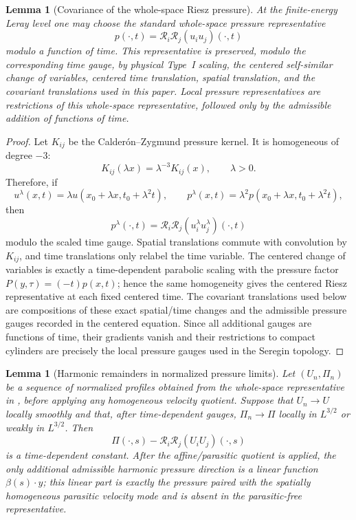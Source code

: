 \documentclass[11pt]{amsart}
\numberwithin{equation}{section}
\theoremstyle{plain}
\newtheorem{lemma}[theorem]{Lemma}
\theoremstyle{definition}
\theoremstyle{remark}
\begin{document}
\begin{lemma}[Covariance of the whole-space Riesz pressure]
\label{lem:whole-space-riesz-pressure-covariance}
At the finite-energy Leray level one may choose the standard whole-space
pressure representative
\[
   p(\cdot,t)=\mathcal R_i\mathcal R_j(u_i u_j)(\cdot,t)
\]
modulo a function of time.  This representative is preserved, modulo the
corresponding time gauge, by physical Type~I scaling, the centered
self-similar change of variables, centered time translation, spatial
translation, and the covariant translations used in this paper.  Local pressure
representatives are restrictions of this whole-space representative, followed
only by the admissible addition of functions of time.
\end{lemma}

\begin{proof}
Let \(K_{ij}\) be the Calder\'on--Zygmund pressure kernel.  It is homogeneous of
degree \(-3\):
\[
   K_{ij}(\lambda x)=\lambda^{-3}K_{ij}(x),\qquad \lambda>0 .
\]
Therefore, if
\[
   u^\lambda(x,t)=\lambda u(x_0+\lambda x,t_0+\lambda^2t),
   \qquad
   p^\lambda(x,t)=\lambda^2p(x_0+\lambda x,t_0+\lambda^2t),
\]
then
\[
   p^\lambda(\cdot,t)
   =
   \mathcal R_i\mathcal R_j
   (u^\lambda_i u^\lambda_j)(\cdot,t)
\]
modulo the scaled time gauge.  Spatial translations commute with convolution by
\(K_{ij}\), and time translations only relabel the time variable.  The centered
change of variables is exactly a time-dependent parabolic scaling with the
pressure factor \(P(y,\tau)=(-t)p(x,t)\); hence the same homogeneity gives the
centered Riesz representative at each fixed centered time.  The covariant
translations used below are compositions of these exact spatial/time changes
and the admissible pressure gauges recorded in the centered equation.  Since
all additional gauges are functions of time, their gradients vanish and their
restrictions to compact cylinders are precisely the local pressure gauges used
in the Seregin topology.
\end{proof}

\begin{lemma}[Harmonic remainders in normalized pressure limits]
\label{lem:local-harmonic-remainders-affine}
Let \((U_n,\Pi_n)\) be a sequence of normalized profiles obtained from the
whole-space representative in
, before applying any
homogeneous velocity quotient.  Suppose that \(U_n\to U\) locally smoothly and
that, after time-dependent gauges, \(\Pi_n\to\Pi\) locally in
\(L^{3/2}\) or weakly in \(L^{3/2}\).  Then
\[
   \Pi(\cdot,s)-\mathcal R_i\mathcal R_j(U_iU_j)(\cdot,s)
\]
is a time-dependent constant.  After the affine/parasitic quotient is applied,
the only additional admissible harmonic pressure direction is a linear function
\(\beta(s)\cdot y\); this linear part is exactly the pressure paired with the
spatially homogeneous parasitic velocity mode and is absent in the
parasitic-free representative.
\end{lemma}
\end{document}
